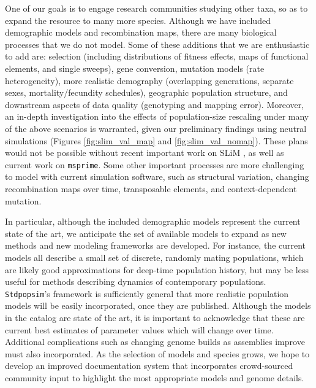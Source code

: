 \documentclass[12pt,halfline,a4paper]{ouparticle}
\newcommand{\Stdpopsim}{\texttt{Stdpopsim}\xspace}
\begin{document}
One of our goals is to engage research communities studying other taxa,
so as to expand the resource to many more species.
Although we have included demographic models and recombination maps,
there are many biological processes that we do not model.
Some of these additions that we are enthusiastic to add are:
selection (including distributions of fitness effects, maps of functional elements, and single sweeps),
gene conversion, mutation models (rate heterogeneity),
more realistic demography (overlapping generations, separate sexes, mortality/fecundity schedules),
geographic population structure,
and downstream aspects of data quality (genotyping and mapping error).
Moreover, an in-depth investigation into the effects of population-size rescaling under many of the
above scenarios is warranted, given our preliminary findings using neutral simulations
(Figures \ref{fig:slim_val_map} and \ref{fig:slim_val_nomap}).
These plans would not be possible without recent important work on SLiM \citep{haller2019slim},
as well as current work on \texttt{msprime}.
Some other important processes are more challenging to model with current simulation software,
such as
structural variation,
changing recombination maps over time,
transposable elements,
and context-dependent mutation.

In particular, although the included demographic models represent the current state of the art,
we anticipate the set of available models to expand
as new methods and new modeling frameworks are developed.
For instance, the current models all describe a small set of discrete, randomly mating populations,
which are likely good approximations for deep-time population history,
but may be less useful for methods describing dynamics of contemporary populations.
\Stdpopsim's framework is sufficiently general that more realistic population models
will be easily incorporated, once they are published.
Although the models in the catalog are state of the art, it is
important to acknowledge that these are current best estimates of parameter values
which will change over time. Additional complications such as changing
genome builds as assemblies improve must also incorporated.
As the selection of models and species grows, we hope to develop an improved
documentation system that incorporates crowd-sourced community input
to highlight the most appropriate models and genome details.
\end{document}
